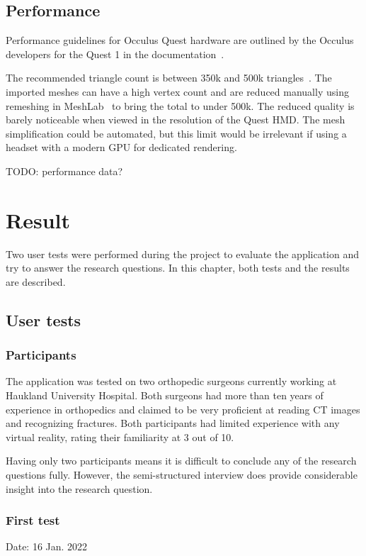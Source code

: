 \documentclass[a4paper]{report}
\begin{document}
\section{Performance}
Performance guidelines for Occulus Quest hardware are outlined by the Occulus developers for the Quest 1 in the documentation~\cite{noauthor_oculus_nodate}.

The recommended triangle count is between 350k and 500k triangles~\cite{noauthor_performance_nodate}. The imported meshes can have a high vertex count and are reduced manually using remeshing in MeshLab~\cite{cignoni_meshlab_2008} to bring the total to under 500k. The reduced quality is barely noticeable when viewed in the resolution of the Quest HMD.
The mesh simplification could be automated, but this limit would be irrelevant if using a headset with a modern GPU for dedicated rendering.

TODO: performance data?


\chapter{Result}

Two user tests were performed during the project to evaluate the application and try to answer the research questions. In this chapter, both tests and the results are described.

\section{User tests}

\subsection{Participants}

The application was tested on two orthopedic surgeons currently working at Haukland University Hospital.
Both surgeons had more than ten years of experience in orthopedics and claimed to be very proficient at reading CT images and recognizing fractures.
Both participants had limited experience with any virtual reality, rating their familiarity at 3 out of 10.

Having only two participants means it is difficult to conclude any of the research questions fully. However, the semi-structured interview does provide considerable insight into the research question.

\subsection{First test}
Date: 16 Jan. 2022
\end{document}
